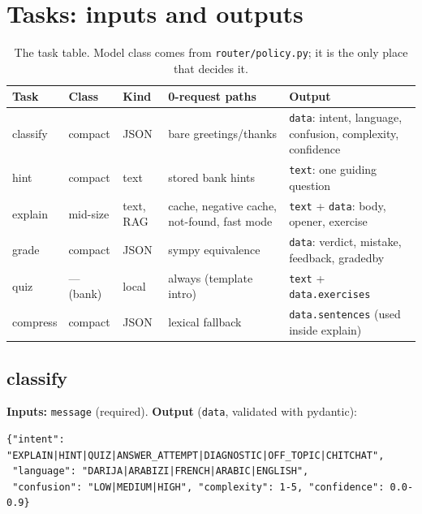 \documentclass[11pt,a4paper]{article}
\renewcommand{\_}{\origus\allowbreak}
\begin{document}
\section{Tasks: inputs and outputs}
\label{sec:tasks}

\begin{table}[H]
\centering\small
\begin{tabularx}{\linewidth}{@{}L{1.6cm} L{1.5cm} L{1.4cm} Y Y@{}}
\toprule
\textbf{Task} & \textbf{Class} & \textbf{Kind} & \textbf{0-request paths} & \textbf{Output}\\
\midrule
classify & compact & JSON & bare greetings/thanks & \texttt{data}: intent, language, confusion, complexity, confidence\\
hint & compact & text & stored bank hints & \texttt{text}: one guiding question\\
explain & mid-size & text, RAG & cache, negative cache, not-found, fast mode & \texttt{text} + \texttt{data}: body, opener, exercise\\
grade & compact & JSON & sympy equivalence & \texttt{data}: verdict, mistake, feedback, graded\_by\\
quiz & — (bank) & local & always (template intro) & \texttt{text} + \texttt{data.exercises}\\
compress & compact & JSON & lexical fallback & \texttt{data.sentences} (used inside explain)\\
\bottomrule
\end{tabularx}
\caption{The task table. Model class comes from \texttt{router/policy.py}; it is the only place that decides it.}
\end{table}

\subsection{classify}

\textbf{Inputs:} \texttt{message} (required). \textbf{Output} (\texttt{data}, validated with pydantic):

\begin{lstlisting}[style=plain]
{"intent": "EXPLAIN|HINT|QUIZ|ANSWER_ATTEMPT|DIAGNOSTIC|OFF_TOPIC|CHITCHAT",
 "language": "DARIJA|ARABIZI|FRENCH|ARABIC|ENGLISH",
 "confusion": "LOW|MEDIUM|HIGH", "complexity": 1-5, "confidence": 0.0-0.9}
\end{lstlisting}
\end{document}
